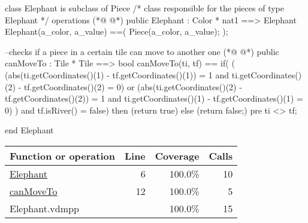 \begin{vdmpp}[breaklines=true]
class Elephant is subclass of Piece
/*
class responsible for the pieces of type Elephant
*/
operations
(*@
\label{Elephant:6}
@*)
 public Elephant : Color * nat1 ==> Elephant
   Elephant(a_color, a_value) ==(
    Piece(a_color, a_value);
   );
   
--checks if a piece in a certain tile can move to another one
(*@
\label{canMoveTo:12}
@*)
 public canMoveTo : Tile * Tile  ==> bool
 canMoveTo(ti, tf) 
  ==  if(
       (
       (abs(ti.getCoordinates()(1) - tf.getCoordinates()(1)) = 1 and ti.getCoordinates()(2) - tf.getCoordinates()(2) = 0) or 
       (abs(ti.getCoordinates()(2) - tf.getCoordinates()(2)) = 1 and ti.getCoordinates()(1) - tf.getCoordinates()(1) = 0)
       ) 
      and tf.isRiver() = false)
       then (return true) 
    else (return false;)
 pre ti <> tf;
 
end Elephant
\end{vdmpp}
\bigskip
\begin{longtable}{|l|r|r|r|}
\hline
Function or operation & Line & Coverage & Calls \\
\hline
\hline
\hyperref[Elephant:6]{Elephant} & 6&100.0\% & 10 \\
\hline
\hyperref[canMoveTo:12]{canMoveTo} & 12&100.0\% & 5 \\
\hline
\hline
Elephant.vdmpp & & 100.0\% & 15 \\
\hline
\end{longtable}

